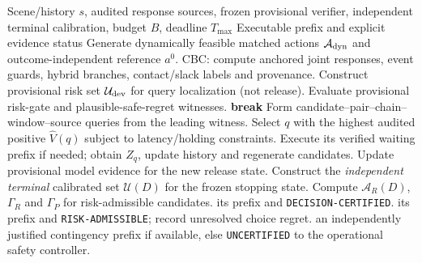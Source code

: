 \documentclass[10pt]{article}
\newcommand{\method}{\textsc{CaVER}}
\begin{document}
\begin{algorithm}[t]
\caption{\method{}: cascade-boundary and decision-evidence planning}
\label{alg:caver}
\begin{algorithmic}[1]
\Require Scene/history $s$, audited response sources, frozen provisional verifier, independent terminal calibration, budget $B$, deadline $T_{\max}$
\Ensure Executable prefix and explicit evidence status
\State Generate dynamically feasible matched actions $\mathcal A_{\rm dyn}$ and outcome-independent reference $a^0$.
\State CBC: compute anchored joint responses, event guards, hybrid branches, contact/slack labels and provenance.
\State Construct provisional risk set $\mathcal U_{\rm dev}$ for query localization (not release).
  \State Evaluate provisional risk-gate and plausible-safe-regret witnesses.
    \State \textbf{break}
  \EndIf
  \State Form candidate--pair--chain--window--source queries from the leading witness.
  \State Select $q$ with the highest audited positive $\widehat V(q)$ subject to latency/holding constraints.
  \State Execute its verified waiting prefix if needed; obtain $Z_q$, update history and regenerate candidates.
  \State Update provisional model evidence for the new release state.
\EndWhile
\State Construct the \emph{independent terminal} calibrated set $\mathcal U(D)$ for the frozen stopping state.
\State Compute $\mathcal A_R(D)$, $\Gamma_R$ and $\Gamma_P$ for risk-admissible candidates.
  \State \Return its prefix and \texttt{DECISION-CERTIFIED}.
  \State \Return its prefix and \texttt{RISK-ADMISSIBLE}; record unresolved choice regret.
\Else
  \State \Return an independently justified contingency prefix if available, else \texttt{UNCERTIFIED} to the operational safety controller.
\EndIf
\end{algorithmic}
\end{algorithm}
\end{document}

